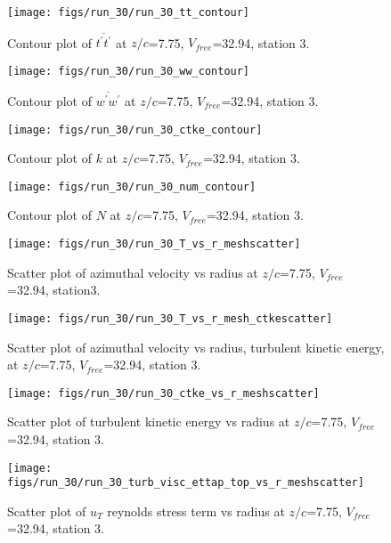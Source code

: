 \begin{figure}[H]
\centering
\texttt{[image: figs/run\_30/run\_30\_tt\_contour]}
\caption{Contour plot of $\overline{t^\prime t^\prime}$ at $z/c$=7.75, $V_{free}$=32.94, station 3.}
\end{figure}


\begin{figure}[H]
\centering
\texttt{[image: figs/run\_30/run\_30\_ww\_contour]}
\caption{Contour plot of $\overline{w^\prime w^\prime}$ at $z/c$=7.75, $V_{free}$=32.94, station 3.}
\end{figure}


\begin{figure}[H]
\centering
\texttt{[image: figs/run\_30/run\_30\_ctke\_contour]}
\caption{Contour plot of $k$ at $z/c$=7.75, $V_{free}$=32.94, station 3.}
\end{figure}


\begin{figure}[H]
\centering
\texttt{[image: figs/run\_30/run\_30\_num\_contour]}
\caption{Contour plot of $N$ at $z/c$=7.75, $V_{free}$=32.94, station 3.}
\end{figure}


\begin{figure}[H]
\centering
\texttt{[image: figs/run\_30/run\_30\_T\_vs\_r\_meshscatter]}
\caption{Scatter plot of azimuthal velocity vs radius at $z/c$=7.75, $V_{free}$=32.94, station3.}
\end{figure}


\begin{figure}[H]
\centering
\texttt{[image: figs/run\_30/run\_30\_T\_vs\_r\_mesh\_ctkescatter]}
\caption{Scatter plot of azimuthal velocity vs radius, turbulent kinetic energy, at $z/c$=7.75, $V_{free}$=32.94, station 3.}
\end{figure}


\begin{figure}[H]
\centering
\texttt{[image: figs/run\_30/run\_30\_ctke\_vs\_r\_meshscatter]}
\caption{Scatter plot of turbulent kinetic energy vs radius at $z/c$=7.75, $V_{free}$=32.94, station 3.}
\end{figure}


\begin{figure}[H]
\centering
\texttt{[image: figs/run\_30/run\_30\_turb\_visc\_ettap\_top\_vs\_r\_meshscatter]}
\caption{Scatter plot of $
u_T$ reynolds stress term vs radius at $z/c$=7.75, $V_{free}$=32.94, station 3.}
\end{figure}


